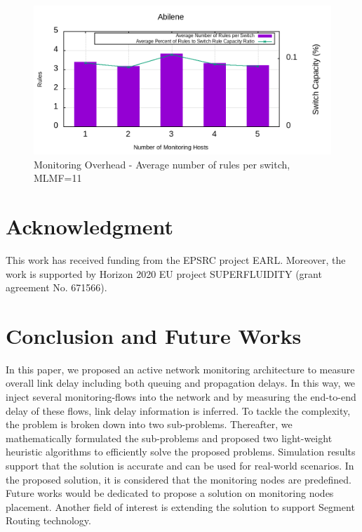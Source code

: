 \documentclass[10pt, journal, letterpaper]{IEEEtran}
\begin{document}
\begin{figure}
    \centering
    \includegraphics[width=\columnwidth]{img/eval_Abilene_barchart_Average_Percent_of_Rules_to_Switch_Rule_Capacity_Ratio_max_len_of_route_11.png}
    \caption{Monitoring Overhead - Average number of rules per switch, MLMF=11}
    \label{fig:eval_barchart_Average_Percent_of_Rules_to_Switch_Rule_Capacity_Ratio_max_len_of_route_11}
\end{figure}

\section*{Acknowledgment}
This work has received funding from the EPSRC project EARL. Moreover, the work is supported by Horizon 2020 EU project SUPERFLUIDITY (grant agreement No. 671566).

\section{Conclusion and Future Works}
In this paper, we proposed an active network monitoring architecture to measure overall link delay including both queuing and propagation delays. In this way, we inject several monitoring-flows into the network and by measuring the end-to-end delay of these flows, link delay information is inferred. To tackle the complexity, the problem is broken down into two sub-problems. Thereafter, we mathematically formulated the sub-problems and proposed two light-weight heuristic algorithms to efficiently solve the proposed problems. Simulation results support that the solution is accurate and can be used for real-world scenarios. In the proposed solution, it is considered that the monitoring nodes are predefined. Future works would be dedicated to propose a solution on monitoring nodes placement. Another field of interest is extending the solution to support Segment Routing technology. 





\end{document}
